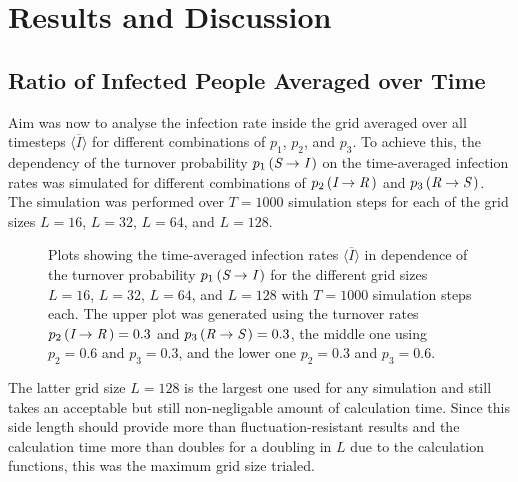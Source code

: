 \section{Results and Discussion}

\subsection{Ratio of Infected People Averaged over Time}

{Aim was now to analyse the infection rate inside the grid averaged over all timesteps $\overline{\langle I\rangle}$ for different combinations of $p_1$, $p_2$, and $p_3$. To achieve this, the dependency of the 
turnover probability $p_1\left(\textit{S}\rightarrow\textit{I}\,\right)$ on the time-averaged infection rates was simulated for different combinations of $p_2\left(\textit{I}\rightarrow\textit{R}\,\right)$
and $p_3\left(\textit{R}\rightarrow\textit{S}\,\right)$. The simulation was performed over $T=1000$ simulation steps for each of the grid sizes $L=16$, $L=32$, $L=64$, and $L=128$.\parfillskip=0pt\par}

\begin{figure}[H]
    \centering
    \resizebox{\textwidth}{!}{}
    \caption{Plots showing the time-averaged infection rates $\overline{\langle I\rangle}$ in dependence of the turnover probability $p_1\left(\textit{S}\rightarrow\textit{I}\,\right)$
    for the different grid sizes $L=16$, $L=32$, $L=64$, and $L=128$ with $T=1000$ simulation steps each. The upper plot was generated using the turnover rates 
    $p_2\left(\textit{I}\rightarrow\textit{R}\,\right)=0.3$ and $p_3\left(\textit{R}\rightarrow\textit{S}\,\right)=0.3$, 
    the middle one using $p_2=0.6$ and $p_3=0.3$, and the lower one $p_2=0.3$ and $p_3=0.6$.}\label{fig:res_dis_avg_inf_over_p1}
\end{figure}

The latter grid size $L=128$ is the largest one used for any simulation and still takes an acceptable but still non-negligable amount of calculation time.
Since this side length should provide more than fluctuation-resistant results and the calculation time more than doubles for a doubling in $L$ due to the calculation functions, this was the maximum grid size trialed.

